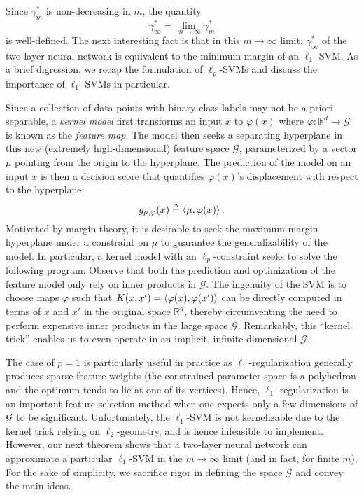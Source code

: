 
Since $\gamma_m^*$ is non-decreasing in $m$, the quantity 
\begin{equation}
\gamma_\infty ^* = \lim_{m\to \infty } \gamma_m^*
\end{equation}
is well-defined. The next interesting fact is that in this $m \to \infty$ limit, $\gamma_{\infty}^*$ of the two-layer neural network is equivalent to the minimum margin of an $\ell_1$-SVM. As a brief digression, we recap the formulation of $\ell_p$-SVMs and discuss the importance of $\ell_1$-SVMs in particular.

Since a collection of data points with binary class labels may not be a priori separable, a \textit{kernel model} first transforms an input $x$ to $\varphi(x)$ where $\varphi: \mathbb{R}^d \to \mathcal{G}$ is known as the \textit{feature map}. The model then seeks a separating hyperplane in this new (extremely high-dimensional) feature space $\mathcal{G}$, parameterized by a vector $\mu$ pointing from the origin to the hyperplane. The prediction of the model on an input $x$ is then a decision score that quantifies $\varphi(x)$'s displacement with respect to the hyperplane:
\begin{equation}
g_{\mu, \varphi}(x) \defeq \l\langle \mu, \varphi(x) \r\rangle.
\end{equation}
Motivated by margin theory, it is desirable to seek the maximum-margin hyperplane under a constraint on $\mu$ to guarantee the generalizability of the model. In particular, a kernel model with an $\ell_p$-constraint seeks to solve the following program:
Observe that both the prediction and optimization of the feature model only rely on inner products in $\mathcal{G}$. The ingenuity of the SVM is to choose maps $\varphi$ such that $K(x, x') = \left\langle \varphi(x), \varphi(x') \right\rangle$ can be directly computed in terms of $x$ and $x'$ in the original space $\mathbb{R}^d$, thereby circumventing the need to perform expensive inner products in the large space $\mathcal{G}$. Remarkably, this ``kernel trick'' enables us to even operate in an implicit, infinite-dimensional $\mathcal{G}$. 

The case of $p=1$ is particularly useful in practice as $\ell_1$-regularization generally produces sparse feature weights (the constrained parameter space is a polyhedron and the optimum tends to lie at one of its vertices). Hence, $\ell_1$-regularization is an important feature selection method when one expects only a few dimensions of $\mathcal G$ to be significant. Unfortunately, the $\ell_1$-SVM is not kernelizable due to the kernel trick relying on $\ell_2$-geometry, and is hence infeasible to implement. However, our next theorem shows that a two-layer neural network can approximate a particular $\ell_1$-SVM in the $m \to \infty$ limit (and in fact, for finite $m$). For the sake of simplicity, we sacrifice rigor in defining the space $\mathcal{G}$ and convey the main ideas.

